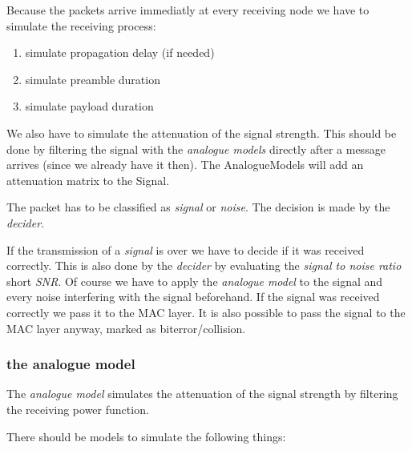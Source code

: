 Because the packets arrive immediatly at every receiving node we have to simulate the receiving process:

\begin{enumerate}
\item simulate propagation delay (if needed)
\item simulate preamble duration
\item simulate payload duration
\end{enumerate}

We also have to simulate the attenuation of the signal strength. This should be done by filtering the signal with the \textit{analogue models} directly after a message arrives (since we already have it then). The AnalogueModels will add an attenuation matrix to the Signal.


The packet has to be classified as \textit{signal} or \textit{noise}. The decision is made by the \textit{decider}.

If the transmission of a \textit{signal} is over we have to decide if it was received correctly. This is also done by the \textit{decider} by evaluating the \textit{signal to noise ratio} short \textit{SNR}. Of course we have to apply the \textit{analogue model} to the signal and every noise interfering with the signal beforehand. If the signal was received correctly we pass it to the MAC layer. It is also possible to pass the signal to the MAC layer anyway, marked as biterror/collision.

\subsubsection{the analogue model}
\label{analogueModel}

The \textit{analogue model} simulates the attenuation of the signal strength by filtering the receiving power function.

There should be models to simulate the following things:


